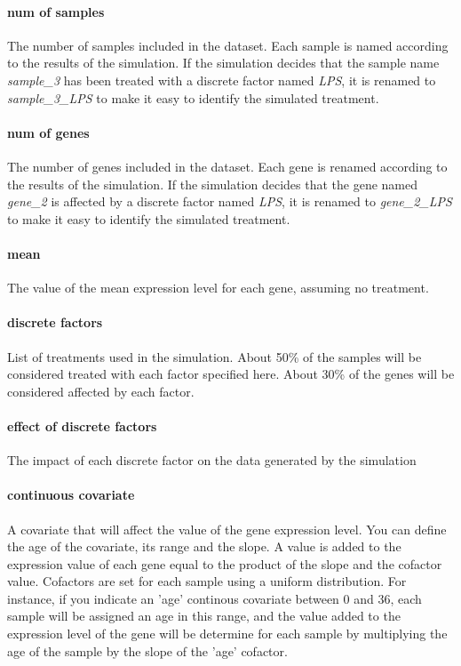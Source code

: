 \paragraph{num of samples}
The number of samples included in the dataset. Each sample is named according to the results of the simulation. If the simulation decides that the sample name \emph{sample\_3 }has been treated with a discrete factor named \emph{LPS}, it is renamed to \emph{sample\_3\_LPS} to make it easy to identify the simulated treatment.

\paragraph{num of genes}
The number of genes included in the dataset. Each gene is renamed according to the results  of the simulation. If the simulation decides that the gene named \emph{gene\_2} is affected by a discrete factor named \emph{LPS}, it is renamed to \emph{gene\_2\_LPS} to make it easy to identify the simulated treatment.

\paragraph{mean}
The value of the mean expression level for each gene, assuming no treatment.

\paragraph{discrete factors}
List of treatments used in the simulation. About 50\% of the samples will be considered treated with each factor specified here. About 30\% of the genes will be considered affected by each factor.

\paragraph{effect of discrete factors}
The impact of each discrete factor on the data generated by the simulation

\paragraph{continuous covariate}
A covariate that will affect the value of the gene expression level. You can define the age of the covariate, its range and the slope. A value is added to the expression value of each gene equal to the product of the slope and the cofactor value. Cofactors are set for each sample using a uniform distribution. For instance, if you indicate an 'age' continous covariate between 0 and 36, each sample will be assigned an age in this range, and the value added to the expression level of the gene will be determine for each sample by multiplying the age of the sample by the slope of the 'age' cofactor.

